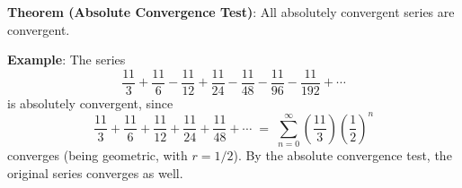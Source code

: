 \documentclass[12pt,fleqn]{article}
\begin{document}
\vspace{0.15in}
\ni
{\bf Theorem (Absolute Convergence Test)}: All absolutely convergent
series are convergent.

\vspace{0.15in}
\ni
{\bf Example}: \; The series
$$ \frac{11}{3} + \frac{11}{6} - \frac{11}{12} + \frac{11}{24} - \frac{11}{48}
  - \frac{11}{96} - \frac{11}{192} + \cdots $$
is absolutely convergent, since
$$ \frac{11}{3} + \frac{11}{6} + \frac{11}{12} + \frac{11}{24} + \frac{11}{48}
  + \cdots \;=\; \sum_{n=0}^\infty \left(\frac{11}{3}\right)
  \left(\frac{1}{2}\right)^n $$
converges (being geometric, with $r = 1/2$).  By the absolute convergence
test, the original series converges as well.
\end{document}
